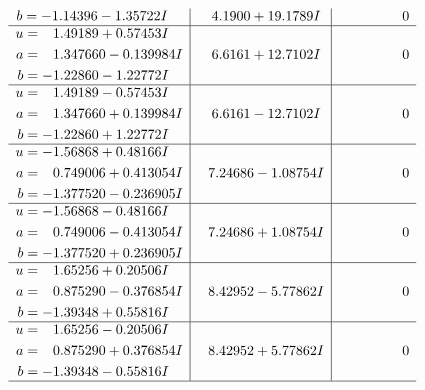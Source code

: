 \documentclass[1p]{elsarticle_modified}
\theoremstyle{definition}
\begin{document}
$$\begin{array}{c|c|c}
\begin{aligned}
b &= -1.14396 - 1.35722 I\end{aligned}
 & \phantom{-}4.1900 + 19.1789 I & \phantom{-0.000000 } 0 \\ \hline\begin{aligned}
u &= \phantom{-}1.49189 + 0.57453 I \\
a &= \phantom{-}1.347660 - 0.139984 I \\
b &= -1.22860 - 1.22772 I\end{aligned}
 & \phantom{-}6.6161 + 12.7102 I & \phantom{-0.000000 } 0 \\ \hline\begin{aligned}
u &= \phantom{-}1.49189 - 0.57453 I \\
a &= \phantom{-}1.347660 + 0.139984 I \\
b &= -1.22860 + 1.22772 I\end{aligned}
 & \phantom{-}6.6161 - 12.7102 I & \phantom{-0.000000 } 0 \\ \hline\begin{aligned}
u &= -1.56868 + 0.48166 I \\
a &= \phantom{-}0.749006 + 0.413054 I \\
b &= -1.377520 - 0.236905 I\end{aligned}
 & \phantom{-}7.24686 - 1.08754 I & \phantom{-0.000000 } 0 \\ \hline\begin{aligned}
u &= -1.56868 - 0.48166 I \\
a &= \phantom{-}0.749006 - 0.413054 I \\
b &= -1.377520 + 0.236905 I\end{aligned}
 & \phantom{-}7.24686 + 1.08754 I & \phantom{-0.000000 } 0 \\ \hline\begin{aligned}
u &= \phantom{-}1.65256 + 0.20506 I \\
a &= \phantom{-}0.875290 - 0.376854 I \\
b &= -1.39348 + 0.55816 I\end{aligned}
 & \phantom{-}8.42952 - 5.77862 I & \phantom{-0.000000 } 0 \\ \hline\begin{aligned}
u &= \phantom{-}1.65256 - 0.20506 I \\
a &= \phantom{-}0.875290 + 0.376854 I \\
b &= -1.39348 - 0.55816 I\end{aligned}
 & \phantom{-}8.42952 + 5.77862 I & \phantom{-0.000000 } 0\\
 \hline 
 \end{array}$$\newpage\newpage\renewcommand{\arraystretch}{1}
\end{document}
